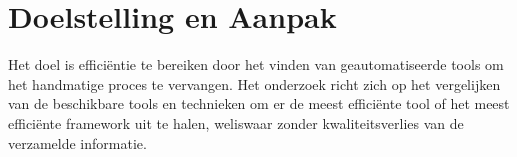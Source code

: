 
\section{Doelstelling en Aanpak}
Het doel is efficiëntie te bereiken door het vinden van geautomatiseerde tools om het handmatige proces te vervangen. 
Het onderzoek richt zich op het vergelijken van de beschikbare tools en technieken om er de meest efficiënte tool of het meest efficiënte framework uit te halen, weliswaar zonder kwaliteitsverlies van de verzamelde informatie.





